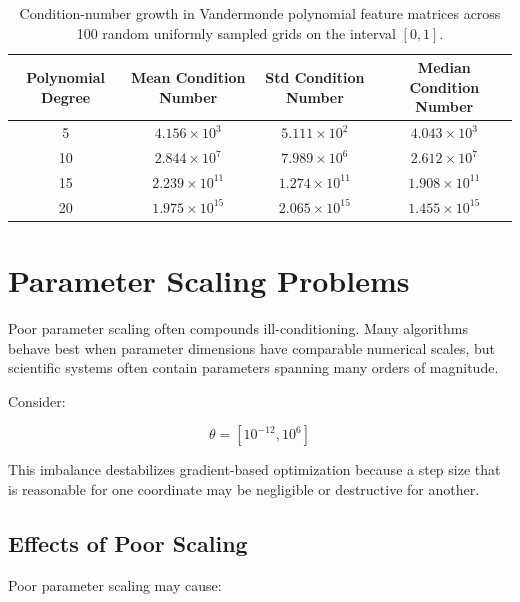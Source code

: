 \begin{table}[htbp]
\centering
\small
\begin{tabular}{cccc}
\toprule
\textbf{Polynomial Degree} &
\textbf{Mean Condition Number} &
\textbf{Std Condition Number} &
\textbf{Median Condition Number} \\
\midrule

5 &
$4.156\times10^{3}$ &
$5.111\times10^{2}$ &
$4.043\times10^{3}$ \\

10 &
$2.844\times10^{7}$ &
$7.989\times10^{6}$ &
$2.612\times10^{7}$ \\

15 &
$2.239\times10^{11}$ &
$1.274\times10^{11}$ &
$1.908\times10^{11}$ \\

20 &
$1.975\times10^{15}$ &
$2.065\times10^{15}$ &
$1.455\times10^{15}$ \\

\bottomrule
\end{tabular}
\caption{Condition-number growth in Vandermonde polynomial feature matrices across 100 random uniformly sampled grids on the interval $[0,1]$.}
\label{tab:vandermonde_conditioning}
\end{table}



\section{Parameter Scaling Problems}

Poor parameter scaling often compounds ill-conditioning. Many algorithms behave best when parameter dimensions have comparable numerical scales, but scientific systems often contain parameters spanning many orders of magnitude.

Consider:

\begin{equation}
\theta = [10^{-12}, 10^6]
\end{equation}

This imbalance destabilizes gradient-based optimization because a step size that is reasonable for one coordinate may be negligible or destructive for another.

\subsection{Effects of Poor Scaling}

Poor parameter scaling may cause:

